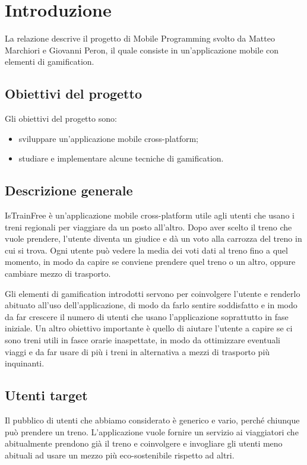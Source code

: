 \chapter{Introduzione\label{sec:introduzione}}
\noindent La relazione descrive il progetto di Mobile Programming svolto da Matteo Marchiori e Giovanni Peron, il quale consiste in un'applicazione mobile con elementi di gamification.

\section{Obiettivi del progetto\label{sec:obiettivi}}
Gli obiettivi del progetto sono:
\begin{itemize}
    \item sviluppare un'applicazione mobile cross-platform;
    \item studiare e implementare alcune tecniche di gamification.
\end{itemize}

\section{Descrizione generale\label{sec:descrizione}}
IsTrainFree è un'applicazione mobile cross-platform utile agli utenti che usano i treni regionali per viaggiare da un posto all'altro. Dopo aver scelto il treno che vuole prendere, l'utente diventa un giudice e dà un voto alla carrozza del treno in cui si trova. Ogni utente può vedere la media dei voti dati al treno fino a quel momento, in modo da capire se conviene prendere quel treno o un altro, oppure cambiare mezzo di trasporto.

Gli elementi di gamification introdotti servono per coinvolgere l'utente e renderlo abituato all'uso dell'applicazione, di modo da farlo sentire soddisfatto e in modo da far crescere il numero di utenti che usano l'applicazione soprattutto in fase iniziale.
Un altro obiettivo importante è quello di aiutare l'utente a capire se ci sono treni utili in fasce orarie inaspettate, in modo da ottimizzare eventuali viaggi e da far usare di più i treni in alternativa a mezzi di trasporto più inquinanti.

\section{Utenti target}
Il pubblico di utenti che abbiamo considerato è generico e vario, perché chiunque può prendere un treno.
L'applicazione vuole fornire un servizio ai viaggiatori che abitualmente prendono già il treno e coinvolgere e invogliare gli utenti meno abituali ad usare un mezzo più eco-sostenibile rispetto ad altri.